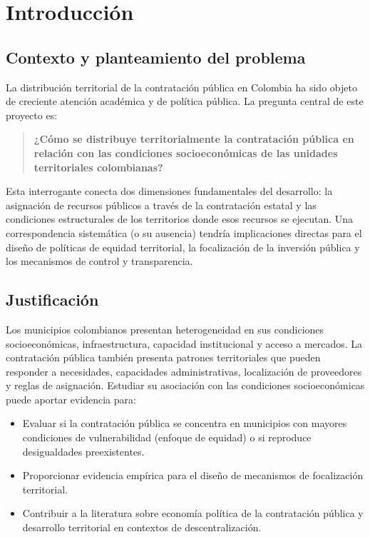 \section{Introducción}
\label{ch:introduccion}

\subsection{Contexto y planteamiento del problema}

La distribución territorial de la contratación pública en Colombia ha sido objeto de creciente atención académica y de política pública. La pregunta central de este proyecto es:

\begin{quote}
\textbf{¿Cómo se distribuye territorialmente la contratación pública en relación con las condiciones socioeconómicas de las unidades territoriales colombianas?}
\end{quote}

Esta interrogante conecta dos dimensiones fundamentales del desarrollo: la asignación de recursos públicos a través de la contratación estatal y las condiciones estructurales de los territorios donde esos recursos se ejecutan. Una correspondencia sistemática (o su ausencia) tendría implicaciones directas para el diseño de políticas de equidad territorial, la focalización de la inversión pública y los mecanismos de control y transparencia.

\subsection{Justificación}

Los municipios colombianos presentan heterogeneidad en sus condiciones socioeconómicas, infraestructura, capacidad institucional y acceso a mercados. La contratación pública también presenta patrones territoriales que pueden responder a necesidades, capacidades administrativas, localización de proveedores y reglas de asignación. Estudiar su asociación con las condiciones socioeconómicas puede aportar evidencia para:

\begin{itemize}
    \item Evaluar si la contratación pública se concentra en municipios con mayores condiciones de vulnerabilidad (enfoque de equidad) o si reproduce desigualdades preexistentes.
    \item Proporcionar evidencia empírica para el diseño de mecanismos de focalización territorial.
    \item Contribuir a la literatura sobre economía política de la contratación pública y desarrollo territorial en contextos de descentralización.
\end{itemize}

